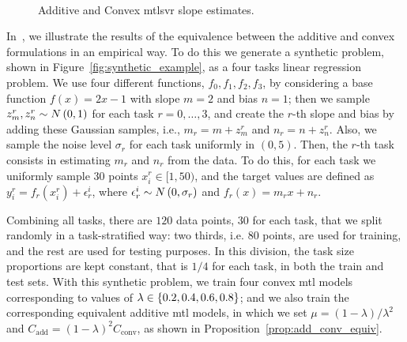 \begin{figure}[t!]
    \centering
    \quad%
    \\
    \caption{Additive and Convex \acrshort{mtl}\acrshort{svr} slope estimates.}
    \label{fig:synthetic_specWeights}
\end{figure}




In~\citet{RuizAD19}, we illustrate the results of the equivalence between the additive and convex formulations in an empirical way. To do this we generate a synthetic problem, shown in Figure~\ref{fig:synthetic_example}, as a four tasks linear regression problem. 
%
We use four different functions, $f_0, f_1, f_2, f_3$, by considering a base function $f(x) = 2x - 1$ with slope $m=2$ and bias $n=1$; then we sample $z_m^r, z_n^r \sim N \left(0, 1\right)$ for each task $r=0, \ldots, 3$, and create the $r$-th slope and bias by adding these Gaussian samples, i.e., $m_r = m + z_m^r$ and $n_r = n + z_n^r$. Also, we sample the noise level $\sigma_r$ for each task uniformly in $(0, 5)$. 
%
Then, the $r$-th task consists in estimating $m_r$ and $n_r$ from the data. To do this, for each task we uniformly sample $30$ points $x_i^r \in [1, 50)$, and the target values are defined as $y_i^r = f_r(x_i^r) + \epsilon^i_r$, where $\epsilon^i_r \sim N \left(0, \sigma_r\right)$ and $f_r(x) = m_r x + n_r$.
%

Combining all tasks, there are $120$ data points, $30$ for each task, that we split randomly in a task-stratified way: two thirds, i.e. $80$ points, are used for training, and the rest are used for testing purposes. In this division, the task size proportions are kept constant, that is $1/4$ for each task, in both the train and test sets. 
%
With this synthetic problem, we train four convex \acrshort{mtl} models corresponding to values of $\lambda \in \left\{0.2, 0.4, 0.6, 0.8\right\}$; and we also train the corresponding equivalent additive \acrshort{mtl} models, in which we set $\mu = (1 - \lambda)/\lambda^2$ and $C_\text{add} = (1 - \lambda)^2 C_\text{conv}$, as shown in Proposition~\ref{prop:add_conv_equiv}.
%

